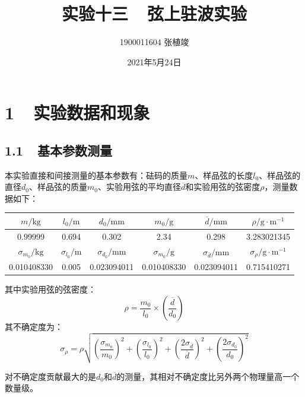 \documentclass[a4paper,fontset=windows]{ctexart}
\begin{document}
\title{\textbf{实验十三\ \ 弦上驻波实验}}
\author{1900011604 张植竣}
\date{2021年5月24日}

\maketitle

\section*{1\ \ 实验数据和现象}

\subsection*{1.1\ \ 基本参数测量}

本实验直接和间接测量的基本参数有：砝码的质量$m$、样品弦的长度$l_0$、样品弦的直径$d_0$、样品弦的质量$m_0$、实验用弦的平均直径$\overline{d}$和实验用弦的弦密度$\rho$，测量数据如下：

\begin{table}[h!]
    \begin{center}
        \begin{tabular}{|c|c|c|c|c|c|}
            \hline
            $m/\mathrm{kg}$ & $l_0/\mathrm{m}$ & $d_0/\mathrm{mm}$ & $m_0/\mathrm{g}$ & $\overline{d}/\mathrm{mm}$ & $\rho/\mathrm{g\cdot m^{-1}}$ \\
            \hline
            0.99999 & 0.694 & 0.302 & 2.34 & 0.298 & 3.283021345 \\
            \hline
            $\sigma_{m_0}/\mathrm{kg}$ & $\sigma_{l_0}/\mathrm{m}$ & $\sigma_{d_0}/\mathrm{mm}$ & $\sigma_{m_0}/\mathrm{g}$ & $\sigma_{\overline{d}}/\mathrm{mm}$ & $\sigma_\rho/\mathrm{g\cdot m^{-1}}$ \\
            \hline
            0.010408330 & 0.005 & 0.023094011 & 0.010408330 & 0.023094011 & 0.715410271 \\
            \hline
        \end{tabular}
    \end{center}
\end{table}

其中实验用弦的弦密度：
\[
\rho = \frac{m_0}{l_0}\times\left(\frac{\overline{d}}{d_0}\right)
\]
其不确定度为：
\[
\sigma_\rho = \rho\sqrt{\left(\frac{\sigma_{m_0}}{m_0}\right)^2 + \left(\frac{\sigma_{l_0}}{l_0}\right)^2 + \left(\frac{2\sigma_{\overline{d}}}{\overline{d}}\right)^2 + \left(\frac{2\sigma_{d_0}}{d_0}\right)^2}
\]

对不确定度贡献最大的是$d_0$和$\overline{d}$的测量，其相对不确定度比另外两个物理量高一个数量级。
\end{document}
